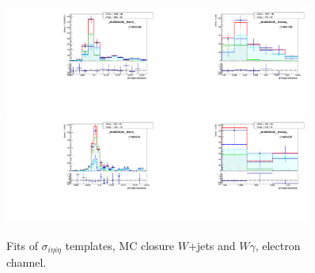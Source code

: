\begin{figure}[htb]
\begin{center}
   \includegraphics[width=0.45\textwidth]{../figs/figs_v11/ELECTRON_WGamma/MCclosureWjetsPlusWg/c_TEMPL_SIHIH_UNblind__phoEt25to30__Barrel__RooFit_MCclosure.pdf}\includegraphics[width=0.45\textwidth]{../figs/figs_v11/ELECTRON_WGamma/MCclosureWjetsPlusWg/c_TEMPL_SIHIH_UNblind__phoEt25to30__Endcap__RooFit_MCclosure.pdf}\\
   \includegraphics[width=0.45\textwidth]{../figs/figs_v11/ELECTRON_WGamma/MCclosureWjetsPlusWg/c_TEMPL_SIHIH_UNblind__phoEt30to35__Barrel__RooFit_MCclosure.pdf}\includegraphics[width=0.45\textwidth]{../figs/figs_v11/ELECTRON_WGamma/MCclosureWjetsPlusWg/c_TEMPL_SIHIH_UNblind__phoEt30to35__Endcap__RooFit_MCclosure.pdf}\\
  \label{fig:templateFits_MCclosureWjetsPlusWg_SIHIH_ELECTRON_1}
  \caption{Fits of $\sigma_{i \eta i \eta}$ templates, MC closure $W$+jets and $W\gamma$, electron channel.}
  \end{center}
\end{figure}

